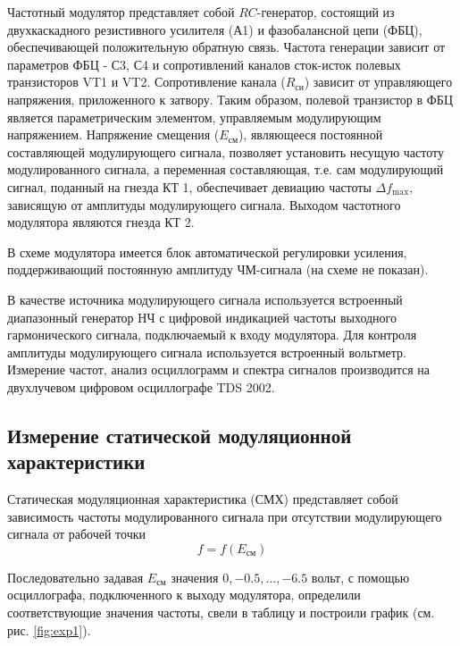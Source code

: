 \documentclass[a4paper,12pt]{article}
\begin{document}
Частотный модулятор представляет собой $RC$-генератор, состоящий из двухкаскадного резистивного усилителя (А1) и фазобалансной цепи (ФБЦ), обеспечивающей положительную обратную связь. Частота генерации зависит от параметров ФБЦ - С3, С4 и сопротивлений каналов сток-исток полевых транзисторов VT1 и VT2. Сопротивление канала ($R_\text{си}$) зависит от управляющего напряжения, приложенного к затвору. Таким образом, полевой транзистор в ФБЦ является параметрическим элементом, управляемым модулирующим напряжением. Напряжение смещения ($E_\text{см}$), являющееся постоянной составляющей модулирующего сигнала, позволяет установить несущую частоту модулированного сигнала, а переменная составляющая, т.е. сам модулирующий сигнал, поданный на гнезда КТ 1, обеспечивает девиацию частоты $\Delta f_\text{max}$, зависящую от амплитуды модулирующего сигнала. Выходом частотного модулятора являются гнезда КТ 2.

В схеме модулятора имеется блок автоматической регулировки усиления, поддерживающий постоянную амплитуду ЧМ-сигнала (на схеме не показан).

В качестве источника модулирующего сигнала используется встроенный диапазонный генератор НЧ с цифровой индикацией частоты выходного гармонического сигнала, подключаемый к входу модулятора. Для контроля амплитуды модулирующего сигнала используется встроенный вольтметр. Измерение частот, анализ осциллограмм и спектра сигналов производится на двухлучевом цифровом осциллографе TDS 2002.


\subsection{Измерение статической модуляционной характеристики}

Статическая модуляционная характеристика (СМХ) представляет собой зависимость частоты модулированного сигнала при отсутствии модулирующего сигнала от рабочей точки
\begin{equation}
	f=f(E_\text{см})
\end{equation}

Последовательно задавая $E_\text{см}$ значения $0,-0.5,\ldots,-6.5$ вольт, с помощью осциллографа, подключенного к выходу модулятора, определили соответствующие значения частоты, свели в таблицу и построили график (см. рис. \ref{fig:exp1}).
\end{document}
